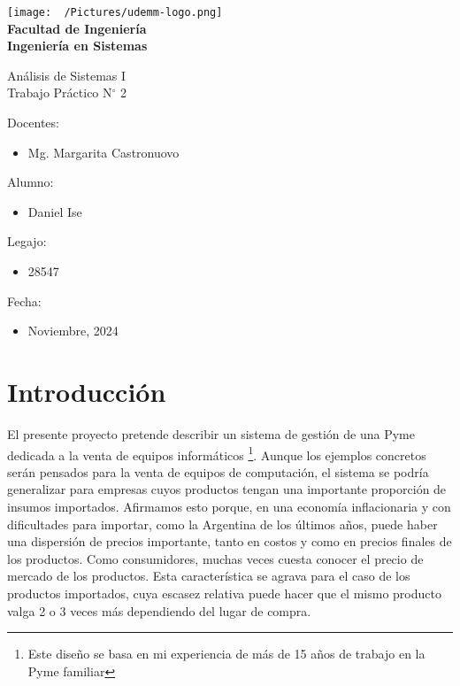 \documentclass[11pt]{article}
\begin{document}
\thispagestyle{empty}

\begin{center}
	\vspace*{.5cm}
	\texttt{[image: ~/Pictures/udemm-logo.png]}\\
	\vspace{.2cm}
	\Large
	\textbf{Facultad de Ingeniería}\\
	\textbf{Ingeniería en Sistemas}\\
	\vspace{2cm}

	\Huge
	Análisis de Sistemas I\\
	Trabajo Práctico N\(^\circ\) 2 \\
	\vfill

	\raggedright
	\Large
	Docentes:
	\begin{itemize}
		\item[] Mg. Margarita Castronuovo \\
	\end{itemize}
	Alumno:
	\begin{itemize}
		\item[] Daniel Ise
	\end{itemize}
	Legajo:
	\begin{itemize}
		\item[] 28547
	\end{itemize}
	Fecha:
	\begin{itemize}
		\item[] Noviembre, 2024
	\end{itemize}
\end{center}

\pagebreak

\section{Introducción}

El presente proyecto pretende describir un sistema de gestión de una Pyme dedicada a la venta de equipos informáticos
\footnote{Este diseño se basa en mi experiencia de más de 15 años de trabajo en la Pyme familiar}.
Aunque los ejemplos concretos serán pensados para la venta de equipos de computación, 
el sistema se podría generalizar para empresas cuyos productos tengan una importante proporción de insumos importados.
Afirmamos esto porque,
en una economía inflacionaria y con dificultades para importar,
como la Argentina de los últimos años,
puede haber una dispersión de precios importante,
tanto en costos y como en precios finales de los productos.
Como consumidores, 
muchas veces cuesta conocer el precio de mercado de los productos. 
Esta característica se agrava para el caso de los productos importados,
cuya escasez relativa puede hacer que el mismo producto valga 2 o 3 veces más dependiendo del lugar de compra.
\end{document}
